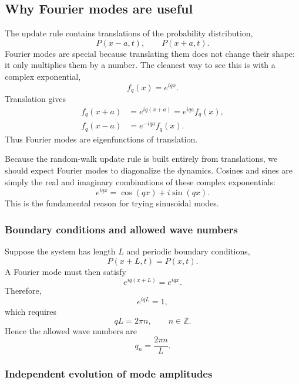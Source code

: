 \subsection{Why Fourier modes are useful}
\label{sec:fourier}


The update rule contains translations of the probability distribution,
\[
    P(x-a,t), \qquad P(x+a,t).
\]
Fourier modes are special because translating them does not change their shape: it only multiplies them by a number.
The cleanest way to see this is with a complex exponential,
\[
    f_q(x) = e^{iqx}.
\]
Translation gives
\begin{align*}
    f_q(x+a) &= e^{iq(x+a)} = e^{iqa}f_q(x),
    \\
    f_q(x-a) &= e^{-iqa}f_q(x).
\end{align*}
Thus Fourier modes are eigenfunctions of translation.

Because the random-walk update rule is built entirely from translations, we should expect Fourier modes to diagonalize the dynamics.
Cosines and sines are simply the real and imaginary combinations of these complex exponentials:
\[
    e^{iqx} = \cos(qx) + i\sin(qx).
\]
This is the fundamental reason for trying sinusoidal modes.
% 
% 

\subsubsection{Boundary conditions and allowed wave numbers}
\label{sec:allowed-modes}


Suppose the system has length $L$ and periodic boundary conditions,
\[
    P(x+L,t) = P(x,t).
\]
A Fourier mode must then satisfy
\[
    e^{iq(x+L)} = e^{iqx}.
\]
Therefore,
\[
    e^{iqL}=1,
\]
which requires
\[
    qL=2\pi n, \qquad n\in\mathbb{Z}.
\]
Hence the allowed wave numbers are
\[
    \boxed{ q_n = \frac{2\pi n}{L}. }
\]
% 

\subsubsection{Independent evolution of mode amplitudes}
\label{sec:mode-amplitudes}


